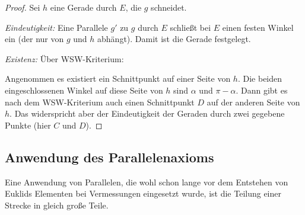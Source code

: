 
\begin{proof}
Sei $h$ eine Gerade durch $E$, die $g$ schneidet. %

{\em Eindeutigkeit:} Eine Parallele $g'$ zu $g$ durch $E$ schließt bei $E$ einen festen Winkel ein
(der nur von $g$ und $h$ abhängt). Damit ist die Gerade festgelegt.

{\em Existenz:} Über WSW-Kriterium:

Angenommen es existiert ein Schnittpunkt auf einer Seite von $h$. Die beiden eingeschlossenen
Winkel auf diese Seite von $h$ sind $\alpha$ und $\pi-\alpha$. Dann gibt es nach dem WSW-Kriterium
auch einen Schnittpunkt $D$ auf der anderen Seite von $h$. Das widerspricht aber der Eindeutigkeit
der Geraden durch zwei gegebene Punkte (hier $C$ und $D$).
\end{proof}

\subsection*{Anwendung des Parallelenaxioms}

Eine Anwendung von Parallelen, die wohl schon lange vor dem Entstehen von Euklids Elementen bei
Vermessungen eingesetzt wurde, ist die Teilung einer Strecke in gleich große Teile.

